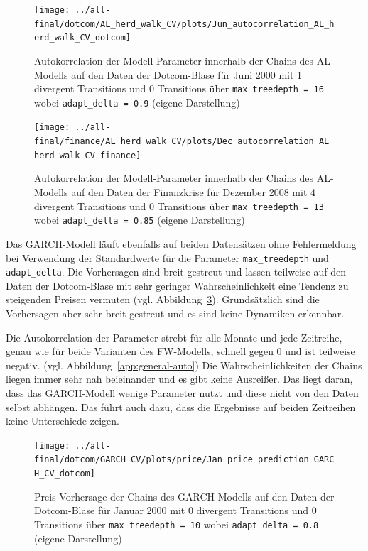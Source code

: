 \documentclass[ngerman]{ttlab-qualify}
\begin{document}
\begin{figure}[h]
\begin{center}
\texttt{[image: ../all-final/dotcom/AL\_herd\_walk\_CV/plots/Jun\_autocorrelation\_AL\_herd\_walk\_CV\_dotcom]}
\caption{Autokorrelation der Modell-Parameter innerhalb der Chains des AL-Modells auf den Daten der Dotcom-Blase für Juni 2000 mit 1 divergent Transitions und 0 Transitions über \texttt{max\_treedepth  = 16} wobei \texttt{adapt\_delta = 0.9} (eigene Darstellung)}
\label{fig:AL-dotcom-jun-auto}
\end{center}
\end{figure}

\begin{figure}[h]
\begin{center}
\texttt{[image: ../all-final/finance/AL\_herd\_walk\_CV/plots/Dec\_autocorrelation\_AL\_herd\_walk\_CV\_finance]}
\caption{Autokorrelation der Modell-Parameter innerhalb der Chains des AL-Modells auf den Daten der Finanzkrise für Dezember 2008 mit 4 divergent Transitions und 0 Transitions über \texttt{max\_treedepth  = 13} wobei \texttt{adapt\_delta = 0.85} (eigene Darstellung)}
\label{fig:AL-finance-dec-auto}
\end{center}
\end{figure}

Das GARCH-Modell läuft ebenfalls auf beiden Datensätzen ohne Fehlermeldung bei Verwendung der Standardwerte für die Parameter \verb|max_treedepth| und \verb|adapt_delta|. Die Vorhersagen sind breit gestreut und lassen teilweise auf den Daten der Dotcom-Blase mit sehr geringer Wahrscheinlichkeit eine Tendenz zu steigenden Preisen vermuten (vgl. Abbildung~\ref{fig:GARCH-dotcom-jan-price}). Grundsätzlich sind die Vorhersagen aber sehr breit gestreut und es sind keine Dynamiken erkennbar.

Die Autokorrelation der Parameter strebt für alle Monate und jede Zeitreihe, genau wie für beide Varianten des FW-Modells, schnell gegen 0 und ist teilweise negativ. (vgl. Abbildung~\ref{app:general-auto}) Die Wahrscheinlichkeiten der Chains liegen immer sehr nah beieinander und es gibt keine Ausreißer. Das liegt daran, dass das GARCH-Modell wenige Parameter nutzt und diese nicht von den Daten selbst abhängen. Das führt auch dazu, dass die Ergebnisse auf beiden Zeitreihen keine Unterschiede zeigen.
 
\begin{figure}[H]
\begin{center}
\texttt{[image: ../all-final/dotcom/GARCH\_CV/plots/price/Jan\_price\_prediction\_GARCH\_CV\_dotcom]}
\caption{Preis-Vorhersage der Chains des GARCH-Modells auf den Daten der Dotcom-Blase für Januar 2000 mit 0 divergent Transitions und 0 Transitions über \texttt{max\_treedepth  = 10} wobei \texttt{adapt\_delta = 0.8} (eigene Darstellung)}
\label{fig:GARCH-dotcom-jan-price}
\end{center}
\end{figure}
\end{document}
